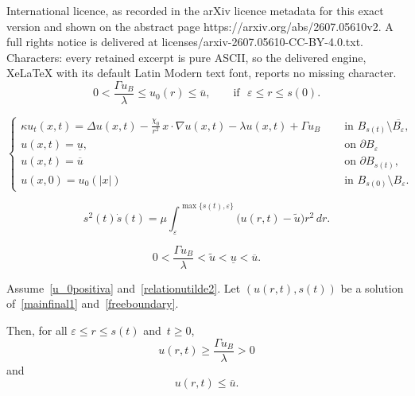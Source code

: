 \documentclass[10pt,a4paper]{amsart}
\renewcommand{\ge}{\geqslant}
\renewcommand{\leq}{\leqslant}
\renewcommand{\le}{\leqslant}
\begin{document}
International licence, as recorded in the arXiv licence metadata for this exact version and shown on the abstract page https://arxiv.org/abs/2607.05610v2. A full rights notice is delivered at licenses/arxiv-2607.05610-CC-BY-4.0.txt. Characters: every retained excerpt is pure ASCII, so the delivered engine, XeLaTeX with its default Latin Modern text font, reports no missing character.
\begin{equation}\label{u_0positiva}
0<\frac{\Gamma u_B}{\lambda}\le u_0(r)\le\overline{u}, \qquad \mbox{if }\,\,\varepsilon\leq r\leq s(0).
\end{equation}

\begin{equation}\label{mainfinal1}
\begin{cases}
\kappa u_t (x,t)= \Delta u(x, t) - \displaystyle\frac{\chi_0}{r^2}\, x\cdot\nabla u(x, t) -\lambda u(x, t)+ \Gamma u_B 
&\quad\mbox{ in }B_{s(t)}\setminus\overline{B_\varepsilon},\\
u(x, t) = \underline{u}, &\quad\mbox{ on } \partial B_\varepsilon \\
u(x, t) = \overline{u} &\quad\mbox{ on } \partial B_{s(t)}, \\
u(x, 0) = u_0(|x|) &\quad\mbox{ in } B_{s(0)}\setminus B_\varepsilon.
\end{cases}
\end{equation}

\begin{equation}\label{freeboundary}
s^2(t)\dot s(t)=\mu\int_\varepsilon^{\max\{s(t),\varepsilon\}}\big(u(r,t)-\widetilde u\big)r^2\,dr.
\end{equation}

\begin{equation}\label{relationutilde2}
0<\frac{\Gamma u_B}{\lambda}<\widetilde u < \underline{u} < \overline{u}.
\end{equation}

\begin{lemma}\label{lemma0<u<utilde}
Assume~\eqref{u_0positiva} and~\eqref{relationutilde2}.
Let $(u(r,t), s(t))$ be a solution of~\eqref{mainfinal1} and~\eqref{freeboundary}.

Then, for all $\varepsilon\le r\le s(t)$ and~$t\ge0$,
\begin{equation}\label{prima0}
u(r,t)\ge \frac{\Gamma u_B}{\lambda}>0
\end{equation}
and
\begin{equation}\label{prima4}
u(r,t)\leq\overline{u}.
\end{equation}
\end{lemma}
\end{document}
